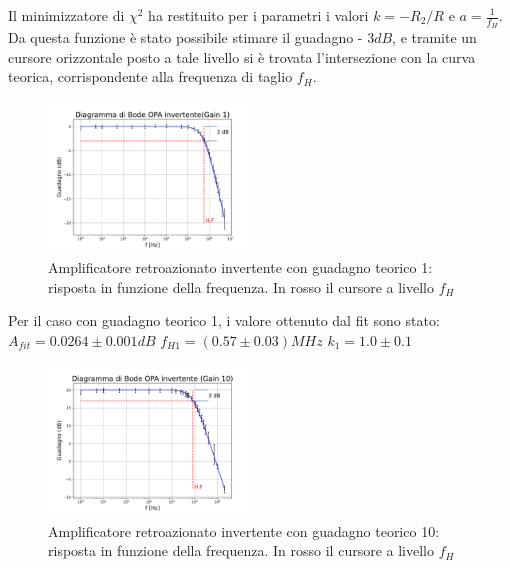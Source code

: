 \documentclass[journal]{IEEEtran}
\begin{document}
Il minimizzatore di $\chi^2$ ha restituito per i parametri i valori $k = -R_2/R$ e $a = \frac{1}{f_H}$. Da questa funzione è stato possibile stimare il guadagno - $3 dB$, e tramite un cursore orizzontale posto a tale livello si è trovata l'intersezione con la curva teorica, corrispondente alla frequenza di taglio $f_H$.

\begin{figure}[H]%
\begin{center}
\includegraphics[width=0.48\textwidth]{analysis/output/OPA-bode_gain1(mag).pdf}
\caption{Amplificatore retroazionato invertente con guadagno teorico 1: risposta in funzione della frequenza. In rosso il cursore a livello $f_H$}
\label{fig:closed_loop_inv_gain_1}
\end{center}
\end{figure}

Per il caso con guadagno teorico 1, i valore ottenuto dal fit sono stato:
$A_{fit} = 0.0264 \pm 0.001 dB$
$f_{H1} = (0.57 \pm 0.03) MHz$
$k_1 = 1.0 \pm 0.1$

\begin{figure}[H]%
\begin {center}
\includegraphics[width=0.48\textwidth]{analysis/output/OPA-bode_gain10(mag).pdf}
\caption{Amplificatore retroazionato invertente con guadagno teorico 10: risposta in funzione della frequenza. In rosso il cursore a livello $f_H$ }
\label{fig:closed_loop_inv_gain_10}
\end {center}
\end{figure}
\end{document}
